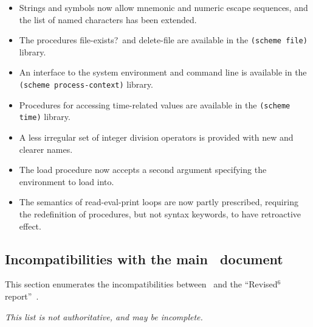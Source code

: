 \begin{itemize}
\item Strings and symbols now allow mnemonic and numeric escape
sequences, and the list of named characters has been extended.

\item The procedures {\cf file-exists?}\ and {\cf delete-file} are available in the
{\tt (scheme file)} library.

\item An interface to the system environment and command line is
available in the {\tt (scheme process-context)} library.

\item Procedures for accessing time-related values are available in the
{\tt (scheme time)} library.

\item A less irregular set of integer division operators is provided
with new and clearer names.

\item The {\cf load} procedure now accepts a second argument specifying the environment to
load into.

\item The semantics of read-eval-print loops are now partly prescribed,
requiring the redefinition of procedures, but not syntax keywords, to have retroactive effect.

\end{itemize}

\subsection*{Incompatibilities with the main \rsixrs\ document}
This section enumerates the incompatibilities between \rsevenrs~and
the ``Revised$^6$ report''~\cite{R6RS}.

{\em This list is not authoritative, and may be incomplete.}

